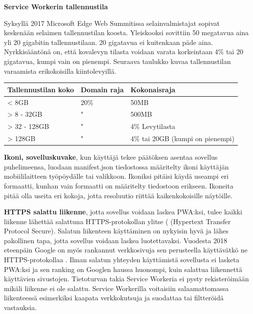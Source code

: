 \documentclass{tktltiki}
\begin{document}
\textbf{Service Workerin tallennustila}

Syksyllä 2017 Microsoft Edge Web Summitissa selainvalmistajat sopivat keskenään selaimen tallennustilan koosta. \cite{Love} Yleiskooksi sovittiin 50 megatavua aina yli 20 gigabitin tallennustilaan. 20 gigatavua ei kuitenkaan päde aina. Nyrkkisääntönä on, että kovalevyn tilasta voidaan varata korkeintaan 4\% tai 20 gigatavua, kumpi vain on pienempi. Seuraava taulukko kuvaa tallennustilan varaamista erikokoisilla kiintolevyillä.

\begin{table}[!ht]
\begin{center}
  \begin{tabular}{|L{5cm}|L{5cm}|L{5cm}|}
    \hline
    \textbf{Tallennustilan koko} & 
    \textbf{Domain raja} &
    \textbf{Kokonaisraja}
    \\ \hline
    < 8GB & 20\% & 50MB \\ \hline
    > 8 - 32GB & " & 500MB \\ \hline
    > 32 - 128GB & " & 4\% Levytilasta \\ \hline
    > 128GB & " & 4\% tai 20GB (kumpi on pienempi) \\
    \hline
  \end{tabular}
\end{center}
\label{table:selaimentallennustila}
\end{table}


\textbf{Ikoni, sovelluskuvake}, kun käyttäjä tekee päätöksen asentaa sovellus puhelimeensa, luodaan manifest.json tiedostossa määritelty ikoni käyttäjän mobiililaitteen työpöydälle tai valikkoon. Ikoniksi pitäisi käydä useampi eri formaatti, kunhan vain formaatti on määritelty tiedostoon erikseen. Ikoneita pitää olla useita eri kokoja, jotta resoluutio riittää kaikenkokoisille näytöille.

\textbf{HTTPS salattu liikenne}, jotta sovellus voidaan laskea PWA:ksi, tulee kaikki liikenne lähettää salattuna HTTPS-protokollan ylitse ( (Hypertext Transfer Protocol Secure). Salatun liikenteen käyttäminen on nykyisin hyvä ja lähes pakollinen tapa, jotta sovellus voidaan laskea luotettavaksi. Vuodesta 2018 eteenpäin Google on myös rankannut verkkosivuja sen perusteella käyttävätkö ne HTTPS-protokollaa \cite{Eisworth}. Ilman salatun yhteyden käyttämistä sovellusta ei lasketa PWA:ksi ja sen ranking on Googlen haussa huonompi, kuin salattua liikennettä käyttävien sivustojen. Tietoturvan takia Service Workeria ei pysty rekisteröimään mikäli liikenne ei ole salattu. \cite{biorn2017progressive} Service Workerilla voitaisiin salaamattomassa liikenteessä esimerkiksi kaapata verkkokutsuja ja suodattaa tai filtteröidä vastauksia.
\end{document}
